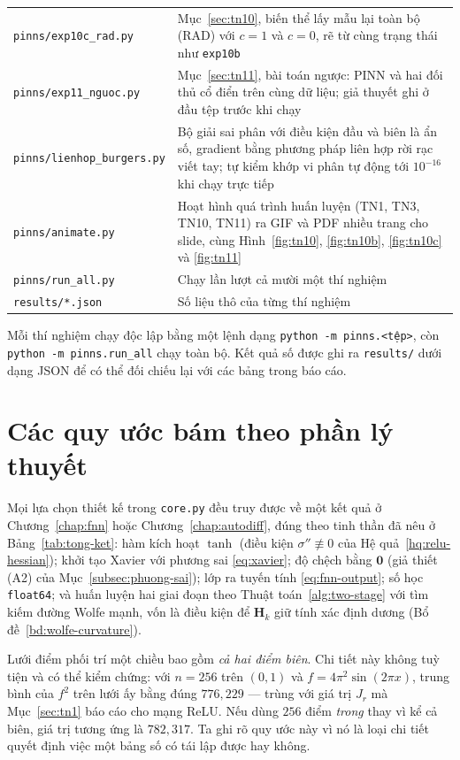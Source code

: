 \begin{longtable}{@{}l p{9.2cm}@{}}
\texttt{pinns/exp10c\_rad.py} & Mục~\ref{sec:tn10}, biến thể lấy mẫu lại toàn
  bộ (RAD) với $c = 1$ và $c = 0$, rẽ từ cùng trạng thái như
  \texttt{exp10b} \\
\texttt{pinns/exp11\_nguoc.py} & Mục~\ref{sec:tn11}, bài toán ngược: PINN và hai
  đối thủ cổ điển trên cùng dữ liệu; giả thuyết ghi ở đầu tệp trước khi chạy \\
\texttt{pinns/lienhop\_burgers.py} & Bộ giải sai phân với điều kiện đầu và biên là
  ẩn số, gradient bằng phương pháp liên hợp rời rạc viết tay; tự kiểm khớp vi phân
  tự động tới $10^{-16}$ khi chạy trực tiếp \\
\texttt{pinns/animate.py} & Hoạt hình quá trình huấn luyện (TN1, TN3, TN10,
  TN11) ra GIF và PDF nhiều trang cho slide, cùng
  Hình~\ref{fig:tn10}, \ref{fig:tn10b}, \ref{fig:tn10c} và \ref{fig:tn11} \\
\texttt{pinns/run\_all.py} & Chạy lần lượt cả mười một thí nghiệm \\
\texttt{results/*.json} & Số liệu thô của từng thí nghiệm \\
\end{longtable}
\endgroup

Mỗi thí nghiệm chạy độc lập bằng một lệnh dạng
\texttt{python -m pinns.<tệp>}, còn \texttt{python -m pinns.run\_all}
chạy toàn bộ. Kết quả số được ghi ra \texttt{results/} dưới dạng JSON để có thể
đối chiếu lại với các bảng trong báo cáo.

\section{Các quy ước bám theo phần lý thuyết}

Mọi lựa chọn thiết kế trong \texttt{core.py} đều truy được về một kết quả ở
Chương~\ref{chap:fnn} hoặc Chương~\ref{chap:autodiff}, đúng theo tinh thần đã nêu
ở Bảng~\ref{tab:tong-ket}: hàm kích hoạt $\tanh$ (điều kiện
$\sigma''\not\equiv 0$ của Hệ quả~\ref{hq:relu-hessian}); khởi tạo Xavier với
phương sai \eqref{eq:xavier}; độ chệch bằng $\bm{0}$ (giả thiết (A2) của
Mục~\ref{subsec:phuong-sai}); lớp ra tuyến tính \eqref{eq:fnn-output}; số học
\texttt{float64}; và huấn luyện hai giai đoạn theo
Thuật toán~\ref{alg:two-stage} với tìm kiếm đường Wolfe mạnh, vốn là điều kiện để
$\bm{H}_k$ giữ tính xác định dương (Bổ đề~\ref{bd:wolfe-curvature}).

\begin{nhanxet}
\label{nx:quy-uoc-luoi}
Lưới điểm phối trí một chiều bao gồm \emph{cả hai điểm biên}. Chi tiết này không
tuỳ tiện và có thể kiểm chứng: với $n = 256$ trên $(0,1)$ và
$f = 4\pi^2\sin(2\pi x)$, trung bình của $f^2$ trên lưới ấy bằng đúng
$776{,}229$ --- trùng với giá trị $J_r$ mà Mục~\ref{sec:tn1} báo cáo cho mạng
ReLU. Nếu dùng $256$ điểm \emph{trong} thay vì kể cả biên, giá trị tương ứng là
$782{,}317$. Ta ghi rõ quy ước này vì nó là loại chi tiết quyết định việc một
bảng số có tái lập được hay không.
\end{nhanxet}


